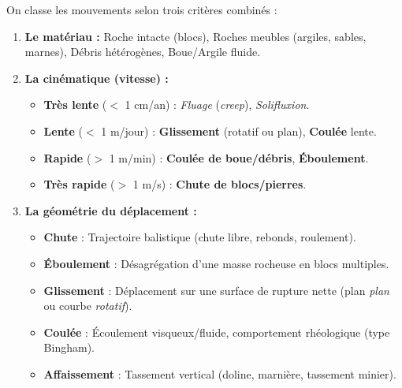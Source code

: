\documentclass[11pt]{article}
\begin{document}
\begin{propriete}
    On classe les mouvements selon trois critères combinés :
    \begin{enumerate}
        \item \textbf{Le matériau :} Roche intacte (blocs), Roches meubles (argiles, sables, marnes), Débris hétérogènes, Boue/Argile fluide.
        \item \textbf{La cinématique (vitesse) :}
            \begin{itemize}
                \item \textbf{Très lente} ($<$ 1 cm/an) : \emph{Fluage} (\emph{creep}), \emph{Solifluxion}.
                \item \textbf{Lente} ($<$ 1 m/jour) : \textbf{Glissement} (rotatif ou plan), \textbf{Coulée} lente.
                \item \textbf{Rapide} ($>$ 1 m/min) : \textbf{Coulée de boue/débris}, \textbf{Éboulement}.
                \item \textbf{Très rapide} ($>$ 1 m/s) : \textbf{Chute de blocs/pierres}.
            \end{itemize}
        \item \textbf{La géométrie du déplacement :}
            \begin{itemize}
                \item \textbf{Chute} : Trajectoire balistique (chute libre, rebonds, roulement).
                \item \textbf{Éboulement} : Désagrégation d'une masse rocheuse en blocs multiples.
                \item \textbf{Glissement} : Déplacement sur une surface de rupture nette (plan \emph{plan} ou courbe \emph{rotatif}).
                \item \textbf{Coulée} : Écoulement visqueux/fluide, comportement rhéologique (type Bingham).
                \item \textbf{Affaissement} : Tassement vertical (doline, marnière, tassement minier).
            \end{itemize}
    \end{enumerate}
\end{propriete}
\end{document}
